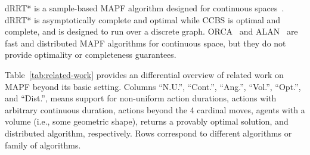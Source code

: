 \documentclass[review]{elsarticle}
\newcommand\roni[1]{\nb{\textbf{Roni:}}{green}{#1}}
\newcommand{\ccbs}{\ac{CCBS}\xspace}
\newcommand{\shortcite}{\cite}
\begin{document}
dRRT* is a sample-based \ac{MAPF} algorithm designed for continuous spaces~\cite{dobson2017scalable}. dRRT* is asymptotically complete and optimal while \ccbs is optimal and complete, and is designed to run over a discrete graph. ORCA~\cite{van2005prioritized,snape2011hybrid} 
and ALAN~\cite{godoy2018alan} are fast and distributed \ac{MAPF} algorithms for continuous space, but they do not provide optimality or completeness guarantees. 






Table~\ref{tab:related-work} provides an differential overview of related work on \ac{MAPF} beyond its basic setting. 
Columns ``N.U.'',  ``Cont.'', ``Ang.'', ``Vol.'', ``Opt.'', and ``Dist.'', means support for non-uniform action durations, 
actions with arbitrary continuous duration, 
actions beyond the 4 cardinal moves, agents with a volume (i.e., some geometric shape), 
returns a provably optimal solution, 
and distributed algorithm, respectively. Rows correspond to  different algorithms or family of algorithms. %








\end{document}
